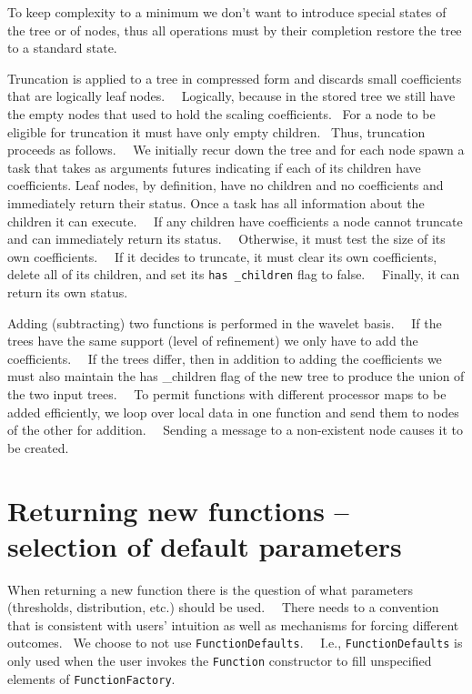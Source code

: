 \documentclass[letterpaper]{article}
\begin{document}
To keep complexity to a minimum we don't want to introduce special states of the tree or of nodes, thus all operations
must by their completion restore the tree to a standard state.

Truncation is applied to a tree in compressed form and discards small coefficients that are logically leaf nodes.
\ \ Logically, because in the stored tree we still have the empty nodes that used to hold the scaling coefficients.
\ For a node to be eligible for truncation it must have only empty children. \ Thus, truncation proceeds as follows.
\ \ We initially recur down the tree and for each node spawn a task that takes as arguments futures indicating if each
of its children have coefficients. Leaf nodes, by definition, have no children and no coefficients and immediately
return their status. Once a task has all information about the children it can execute. \ \ If any children have
coefficients a node cannot truncate and can immediately return its status. \ \ Otherwise, it must test the size of its
own coefficients. \ \ If it decides to truncate, it must clear its own coefficients, delete all of its children, and
set its \texttt{has \_children} flag to false. \ \ Finally, it can return its own status.

Adding (subtracting) two functions is performed in the wavelet basis. \ \ If the trees have the same support (level of
refinement) we only have to add the coefficients. \ \ If the trees differ, then in addition to adding the coefficients
we must also maintain the has \_children flag of the new tree to produce the union of the two input trees. \ \ To
permit functions with different processor maps to be added efficiently, we loop over local data in one function and
send them to nodes of the other for addition. \ \ Sending a message to a non-existent node causes it to be created.

\section[Returning new functions {}-- selection of default parameters]{Returning new functions -- selection of default
parameters}
When returning a new function there is the question of what parameters (thresholds, distribution, etc.) should be used.
\ \ There needs to a convention that is consistent with users' intuition as well as mechanisms for forcing different
outcomes. \ We choose to not use \texttt{FunctionDefaults}. \ \ I.e., \texttt{FunctionDefaults} is only used when the
user invokes the \texttt{Function} constructor to fill unspecified elements of \texttt{FunctionFactory}.
\end{document}
